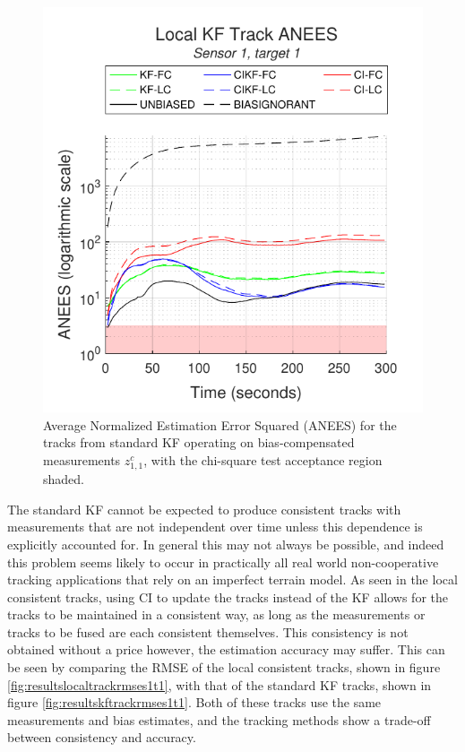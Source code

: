 \documentclass[journal]{IEEEtran}
\begin{document}
\begin{figure}[ht]
    \centering
    \includegraphics[scale=0.85]{kftrack_anees_s1t1.pdf}
    \caption{Average Normalized Estimation Error Squared (ANEES) for the tracks from standard KF operating on bias-compensated measurements  $z_{1,1}^c$, with the chi-square test acceptance region shaded.}
    \label{fig:resultskftrackaneess1t1}
\end{figure}

The standard KF cannot be expected to produce consistent tracks with measurements that are not independent over time unless this dependence is explicitly accounted for. In general this may not always be possible, and indeed this problem seems likely to occur in practically all real world non-cooperative tracking applications that rely on an imperfect terrain model. As seen in the local consistent tracks, using CI to update the tracks instead of the KF allows for the tracks to be maintained in a consistent way, as long as the measurements or tracks to be fused are each consistent themselves. This consistency is not obtained without a price however, the estimation accuracy may suffer. This can be seen by comparing the RMSE of the local consistent tracks, shown in figure \ref{fig:resultslocaltrackrmses1t1}, with that of the standard KF tracks, shown in figure \ref{fig:resultskftrackrmses1t1}. Both of these tracks use the same measurements and bias estimates, and the tracking methods show a trade-off between consistency and accuracy.
\end{document}
